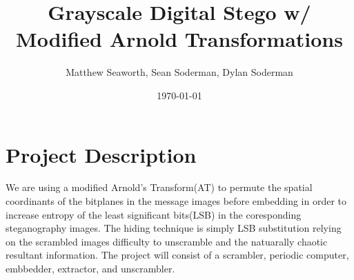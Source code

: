\documentclass{article}
\begin{document}
\title{Grayscale Digital Stego w/ Modified Arnold Transformations}
\author{Matthew Seaworth, Sean Soderman, Dylan Soderman}
\date{\today}
\maketitle

\section{Project Description}
We are using a modified Arnold's Transform(AT) to permute the spatial coordinants of the bitplanes in the message images
before embedding in order to increase entropy of the least significant bits(LSB) in the coresponding steganography images. The
hiding technique is simply LSB substitution relying on the scrambled images difficulty to unscramble and the natuarally chaotic
resultant information. The project will consist of a scrambler, periodic computer, embbedder, extractor, and unscrambler. 
\end{document}
